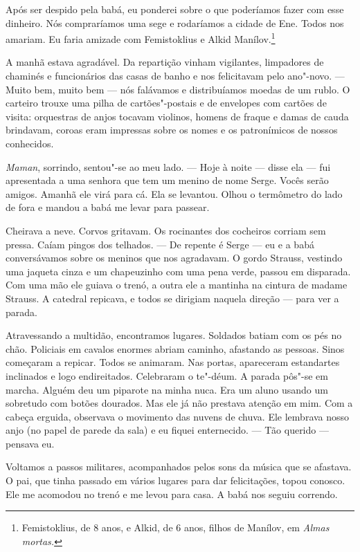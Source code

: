 Após ser despido pela babá, eu ponderei sobre o que poderíamos fazer com
esse dinheiro. Nós compraríamos uma sege e rodaríamos a cidade de Ene.
Todos nos amariam. Eu faria amizade com Femistoklius e Alkid
Manílov.\footnote{Femistoklius, de 8 anos, e Alkid, de 6 anos, filhos de
  Manílov, em \emph{Almas mortas. }}

A manhã estava agradável. Da repartição vinham vigilantes, limpadores de
chaminés e funcionários das casas de banho e nos felicitavam pelo ano"-novo. --- Muito bem, muito bem --- nós falávamos e distribuíamos moedas
de um rublo. O carteiro trouxe uma pilha de cartões"-postais e de
envelopes com cartões de visita: orquestras de anjos tocavam violinos,
homens de fraque e damas de cauda brindavam, coroas eram impressas sobre
os nomes e os patronímicos de nossos conhecidos.

\emph{Maman}, sorrindo, sentou"-se ao meu lado. --- Hoje à noite ---
disse ela --- fui apresentada a uma senhora que tem um menino de nome
Serge. Vocês serão amigos. Amanhã ele virá para cá. Ela se levantou.
Olhou o termômetro do lado de fora e mandou a babá me levar para
passear.

Cheirava a neve. Corvos gritavam. Os rocinantes dos cocheiros corriam
sem pressa. Caíam pingos dos telhados. --- De repente é Serge --- eu e a
babá conversávamos sobre os meninos que nos agradavam. O gordo Strauss,
vestindo uma jaqueta cinza e um chapeuzinho com uma pena verde, passou
em disparada. Com uma mão ele guiava o trenó, a outra ele a mantinha na
cintura de madame Strauss. A catedral repicava, e todos se dirigiam
naquela direção --- para ver a parada.

Atravessando a multidão, encontramos lugares. Soldados batiam com os pés
no chão. Policiais em cavalos enormes abriam caminho, afastando as
pessoas. Sinos começaram a repicar. Todos se animaram. Nas portas,
apareceram estandartes inclinados e logo endireitados. Celebraram o
te"-déum. A parada pôs"-se em marcha. Alguém deu um piparote na minha
nuca. Era um aluno usando um sobretudo com botões dourados. Mas ele já
não prestava atenção em mim. Com a cabeça erguida, observava o movimento
das nuvens de chuva. Ele lembrava nosso anjo (no papel de parede da
sala) e eu fiquei enternecido. --- Tão querido --- pensava eu.

Voltamos a passos militares, acompanhados pelos sons da música que se
afastava. O pai, que tinha passado em vários lugares para dar
felicitações, topou conosco. Ele me acomodou no trenó e me levou para
casa. A babá nos seguiu correndo.

